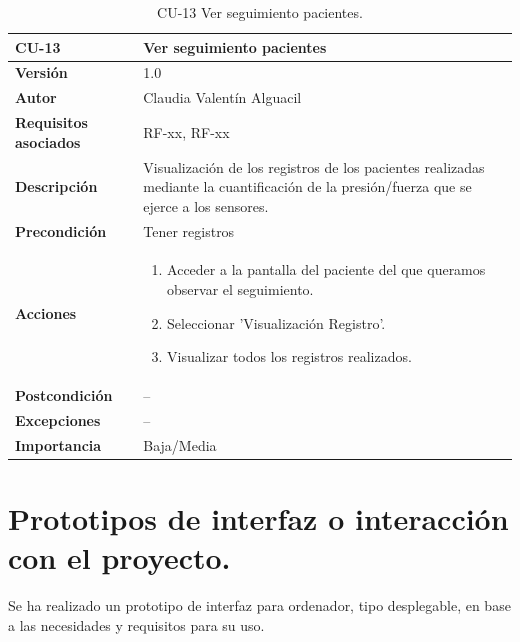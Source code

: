\begin{table}[p]
	\centering
	\begin{tabularx}{\linewidth}{ p{} p{} }
		\toprule
		\textbf{CU-13}    & \textbf{Ver seguimiento pacientes}\\
		\toprule
		\textbf{Versión}              & 1.0    \\
		\textbf{Autor}                & Claudia Valentín Alguacil \\
		\textbf{Requisitos asociados} & RF-xx, RF-xx \\
		\textbf{Descripción}          & Visualización de los registros de los pacientes realizadas mediante la cuantificación de la presión/fuerza que se ejerce a los sensores.\\
		\textbf{Precondición}         & Tener registros \\
		\textbf{Acciones}             &
		\begin{enumerate}
			\def\labelenumi{\arabic{enumi}.}
			\tightlist
			\item Acceder a la pantalla del paciente del que queramos observar el seguimiento.
			\item Seleccionar 'Visualización Registro'.
                \item Visualizar todos los registros realizados.
		\end{enumerate}\\
		\textbf{Postcondición}        &  -- \\
		\textbf{Excepciones}          & -- \\
		\textbf{Importancia}          & Baja/Media \\
		\bottomrule
	\end{tabularx}
	\caption{CU-13 Ver seguimiento pacientes.}
\end{table}


\newpage

\section{Prototipos de interfaz o interacción con el proyecto.}

Se ha realizado un prototipo de interfaz para ordenador, tipo desplegable, en base a las necesidades y requisitos para su uso. 

